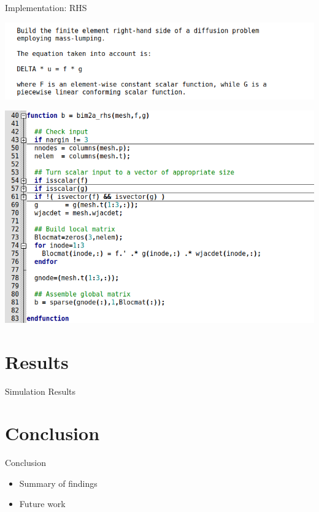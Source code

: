 \documentclass[aspectratio=54,xcolor=dvipsnames]{beamer}
\begin{document}
\begin{frame}{Implementation: RHS}
    \begin{center}
        \begin{minipage}{0.60\textwidth}
            \centering
            \includegraphics[width=\textwidth]{Images/bim_rhs_help.png}
        \end{minipage}\hfill
        \begin{minipage}{0.78\textwidth}
            \centering
            \includegraphics[width=\textwidth]{Images/bim_rhs.png}
        \end{minipage}
    \end{center}
\end{frame}

\section{Results}
\begin{frame}{Simulation Results}

\end{frame}

\section{Conclusion}
\begin{frame}{Conclusion}
    \begin{itemize}
        \item Summary of findings
        \item Future work
    \end{itemize}
\end{frame}
\end{document}
